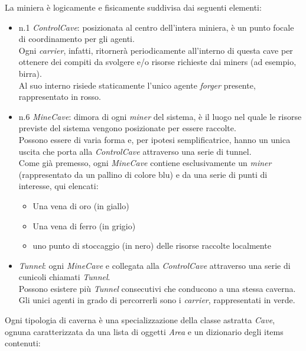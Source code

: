 \documentclass{llncs}
\begin{document}
La miniera è logicamente e fisicamente suddivisa dai seguenti elementi:
\begin{itemize}
	\item n.1 \textit{ControlCave}: posizionata al centro dell'intera miniera, è un punto focale di coordinamento per gli agenti.\\
	Ogni \textit{carrier}, infatti, ritornerà periodicamente all'interno di questa cave per ottenere dei compiti da svolgere e/o risorse richieste dai miners (ad esempio, birra).\\Al suo interno risiede staticamente l'unico agente \textit{forger} presente, rappresentato in rosso.\\
	\item n.6 \textit{MineCave}: dimora di ogni \textit{miner} del sistema, è il luogo nel quale le risorse previste del sistema vengono posizionate per essere raccolte.\\ Possono essere di varia forma e, per ipotesi semplificatrice, hanno un unica uscita che porta alla \textit{ControlCave} attraverso una serie di tunnel.\\
	Come già premesso, ogni \textit{MineCave} contiene esclusivamente un \textit{miner} (rappresentato da un pallino di colore blu) e da una serie di punti di interesse, qui elencati:
	\begin{itemize}
		\item Una vena di oro (in giallo)
		\item Una vena di ferro (in grigio)
		\item uno punto di stoccaggio (in nero) delle risorse raccolte localmente
	\end{itemize}\vspace*{0.4cm}
	
	\item \textit{Tunnel}: ogni \textit{MineCave} e collegata alla \textit{ControlCave} attraverso una serie di cunicoli chiamati \textit{Tunnel}.\\ Possono esistere più \textit{Tunnel} consecutivi che conducono a una stessa caverna.\\ Gli unici agenti in grado di percorrerli sono i \textit{carrier}, rappresentati in verde.
\end{itemize}
Ogni tipologia di caverna è una specializzazione della classe astratta \textit{Cave}, ognuna caratterizzata da una lista di oggetti \textit{Area} e un dizionario degli items contenuti:



\newpage
\end{document}
